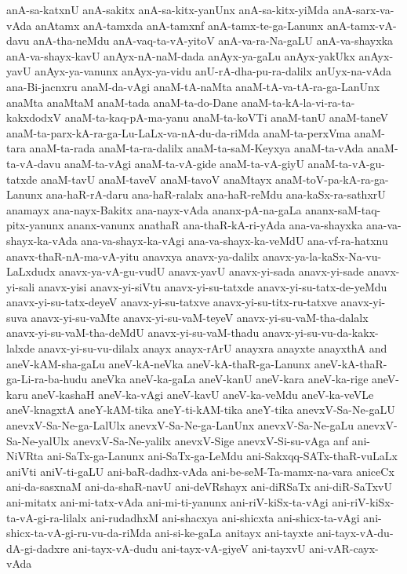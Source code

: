 {anA-sa-katxnU
anA-sakitx
anA-sa-kitx-yanUnx
anA-sa-kitx-yiMda
anA-sarx-va-vAda
anAtamx
anA-tamxda
anA-tamxnf
anA-tamx-te-ga-Lanunx
anA-tamx-vA-davu
anA-tha-neMdu
anA-vaq-ta-vA-yitoV
anA-va-ra-Na-gaLU
anA-va-shayxka
anA-va-shayx-kavU
anAyx-nA-naM-dada
anAyx-ya-gaLu
anAyx-yakUkx
anAyx-yavU
anAyx-ya-vanunx
anAyx-ya-vidu
anU-rA-dha-pu-ra-dalilx
anUyx-na-vAda
ana-Bi-jacnxru
anaM-da-vAgi
anaM-tA-naMta
anaM-tA-va-tA-ra-ga-LanUnx
anaMta
anaMtaM
anaM-tada
anaM-ta-do-Dane
anaM-ta-kA-la-vi-ra-ta-kakxdodxV
anaM-ta-kaq-pA-ma-yanu
anaM-ta-koVTi
anaM-tanU
anaM-taneV
anaM-ta-parx-kA-ra-ga-Lu-LaLx-va-nA-du-da-riMda
anaM-ta-perxVma
anaM-tara
anaM-ta-rada
anaM-ta-ra-dalilx
anaM-ta-saM-Keyxya
anaM-ta-vAda
anaM-ta-vA-davu
anaM-ta-vAgi
anaM-ta-vA-gide
anaM-ta-vA-giyU
anaM-ta-vA-gu-tatxde
anaM-tavU
anaM-taveV
anaM-tavoV
anaMtayx
anaM-toV-pa-kA-ra-ga-Lanunx
ana-haR-rA-daru
ana-haR-ralalx
ana-haR-reMdu
ana-kaSx-ra-sathxrU
anamayx
ana-nayx-Bakitx
ana-nayx-vAda
ananx-pA-na-gaLa
ananx-saM-taq-pitx-yanunx
ananx-vanunx
anathaR
ana-thaR-kA-ri-yAda
ana-va-shayxka
ana-va-shayx-ka-vAda
ana-va-shayx-ka-vAgi
ana-va-shayx-ka-veMdU
ana-vf-ra-hatxnu
anavx-thaR-nA-ma-vA-yitu
anavxya
anavx-ya-dalilx
anavx-ya-la-kaSx-Na-vu-LaLxdudx
anavx-ya-vA-gu-vudU
anavx-yavU
anavx-yi-sada
anavx-yi-sade
anavx-yi-sali
anavx-yisi
anavx-yi-siVtu
anavx-yi-su-tatxde
anavx-yi-su-tatx-de-yeMdu
anavx-yi-su-tatx-deyeV
anavx-yi-su-tatxve
anavx-yi-su-titx-ru-tatxve
anavx-yi-suva
anavx-yi-su-vaMte
anavx-yi-su-vaM-teyeV
anavx-yi-su-vaM-tha-dalalx
anavx-yi-su-vaM-tha-deMdU
anavx-yi-su-vaM-thadu
anavx-yi-su-vu-da-kakx-lalxde
anavx-yi-su-vu-dilalx
anayx
anayx-rArU
anayxra
anayxte
anayxthA
and
aneV-kAM-sha-gaLu
aneV-kA-neVka
aneV-kA-thaR-ga-Lanunx
aneV-kA-thaR-ga-Li-ra-ba-hudu
aneVka
aneV-ka-gaLa
aneV-kanU
aneV-kara
aneV-ka-rige
aneV-karu
aneV-kashaH
aneV-ka-vAgi
aneV-kavU
aneV-ka-veMdu
aneV-ka-veVLe
aneV-knagxtA
aneY-kAM-tika
aneY-ti-kAM-tika
aneY-tika
anevxV-Sa-Ne-gaLU
anevxV-Sa-Ne-ga-LalUlx
anevxV-Sa-Ne-ga-LanUnx
anevxV-Sa-Ne-gaLu
anevxV-Sa-Ne-yalUlx
anevxV-Sa-Ne-yalilx
anevxV-Sige
anevxV-Si-su-vAga
anf
ani-NiVRta
ani-SaTx-ga-Lanunx
ani-SaTx-ga-LeMdu
ani-Sakxqq-SATx-thaR-vuLaLx
aniVti
aniV-ti-gaLU
ani-baR-dadhx-vAda
ani-be-seM-Ta-mamx-na-vara
aniceCx
ani-da-sasxnaM
ani-da-shaR-navU
ani-deVRshayx
ani-diRSaTx
ani-diR-SaTxvU
ani-mitatx
ani-mi-tatx-vAda
ani-mi-ti-yanunx
ani-riV-kiSx-ta-vAgi
ani-riV-kiSx-ta-vA-gi-ra-lilalx
ani-rudadhxM
ani-shacxya
ani-shicxta
ani-shicx-ta-vAgi
ani-shicx-ta-vA-gi-ru-vu-da-riMda
ani-si-ke-gaLa
anitayx
ani-tayxte
ani-tayx-vA-du-dA-gi-dadxre
ani-tayx-vA-dudu
ani-tayx-vA-giyeV
ani-tayxvU
ani-vAR-cayx-vAda
}
